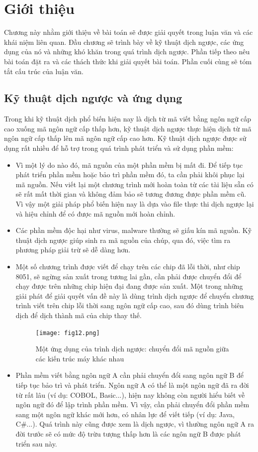 \chapter{Giới thiệu}
\label{sec:gioithieu}


Chương này nhằm giới thiệu về bài toán sẽ được giải quyết trong luận văn và các khái niệm liên quan. Đầu chương sẽ trình bày về kỹ thuật dịch ngược, các ứng dụng của nó và những khó khăn trong quá trình dịch ngược. Phần tiếp theo nêu bài toán đặt ra và các thách thức khi giải quyết bài toán. Phần cuối cùng sẽ tóm tắt cấu trúc của luận văn.

\section{Kỹ thuật dịch ngược và ứng dụng}
Trong khi kỹ thuật dịch phổ biến hiện nay là dịch từ mã viết bằng ngôn ngữ cấp cao xuống mã ngôn ngữ cấp thấp hơn, kỹ thuật dịch ngược thực hiện dịch từ mã ngôn ngữ cấp thấp lên mã ngôn ngữ cấp cao hơn. Kỹ thuật dịch ngược được sử dụng rất nhiều để hỗ trợ trong quá trình phát triển và sử dụng phần mềm:

\begin{itemize}
	\item Vì một lý do nào đó, mã nguồn của một phần mềm bị mất đi. Để tiếp tục phát triển phần mềm hoặc bảo trì phần mềm đó, ta cần phải khôi phục lại mã nguồn. Nếu viết lại một chương trình mới hoàn toàn từ các tài liệu sẵn có sẽ rất mất thời gian và không đảm bảo sẽ tương đương được phần mềm cũ. Vì vậy một giải pháp phổ biến hiện nay là dựa vào file thực thi dịch ngược lại và hiệu chỉnh để có được mã nguồn mới hoàn chỉnh.
	\item Các phần mềm độc hại như virus, malware thường sẽ giấu kín mã nguồn. Kỹ thuật dịch ngược giúp sinh ra mã nguồn của chúp, qua đó, việc tìm ra phương pháp giải trừ sẽ dễ dàng hơn.
	\item Một số chương trình được viết để chạy trên các chip đã lỗi thời, như chip 8051, sẽ ngừng sản xuất trong tương lai gần, cần phải được chuyển đổi để chạy được trên những chip hiện đại đang được sản xuất. Một trong những giải phát để giải quyết vấn đề này là dùng trình dịch ngược để chuyển chương trình viết trên chip lỗi thời sang ngôn ngữ cấp cao, sau đó dùng trình biên dịch để dịch thành mã của chip thay thế.
	
	\begin{figure}[h]
		\centering
		\texttt{[image: fig12.png]}
		\caption{Một ứng dụng của trình dịch ngược: chuyển đổi mã nguồn giữa các kiến trúc máy khác nhau}
	\end{figure}
	\item Phần mềm viết bằng ngôn ngữ A cần phải chuyển đổi sang ngôn ngữ B để tiếp tục bảo trì và phát triển. Ngôn ngữ A có thể là một ngôn ngữ đã ra đời từ rất lâu (ví dụ: COBOL, Basic...), hiện nay không còn người hiểu biết về ngôn ngữ đó để lập trình phần mềm. Vì vậy, cần phải chuyển đổi phần mềm sang một ngôn ngữ khác mới hơn, có nhân lực để viết tiếp (ví dụ: Java, C\#...). Quá trình này cũng được xem là dịch ngược, vì thường ngôn ngữ A ra đời trước sẽ có mức độ trừu tượng thấp hơn là các ngôn ngữ B được phát triển sau này.
\end{itemize}


